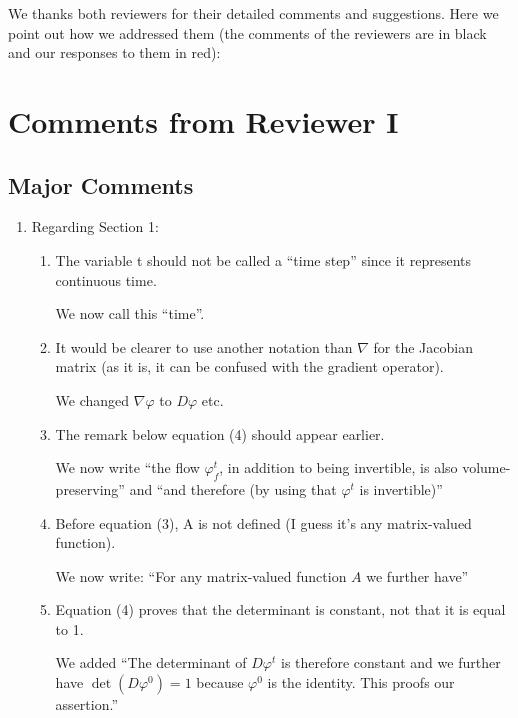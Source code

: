 \documentclass{article}
\begin{document}
We thanks both reviewers for their detailed comments and suggestions. Here we point out how we addressed them (the comments of the reviewers are in black and our responses to them in {\color{mred} red}):

\section{Comments from Reviewer I}

\subsection*{Major Comments}
\begin{enumerate}
\item Regarding Section 1:
\begin{enumerate}[label=\arabic*.]
\item The variable t should not be called a ``time step'' since it represents continuous time.

    {\color{mred}We now call this ``time''}.

\item It would be clearer to use another notation than $\nabla$ for the Jacobian matrix (as it is, it can be confused with the gradient operator).

    {\color{mred}We changed $\nabla\varphi$ to $D\varphi$ etc.}

\item The remark below equation (4) should appear earlier.

    {\color{mred}We now write ``the flow $\varphi_f^t$, in addition to being invertible, is also volume-preserving'' and ``and therefore (by using that $\varphi^t$ is invertible)''}

\item Before equation (3), A is not defined (I guess it's any matrix-valued function).

    {\color{mred} We now write: ``For any matrix-valued function $A$ we further have''}

\item Equation (4) proves that the determinant is constant, not that it is equal to 1.

    {\color{mred} We added ``The determinant of $D\varphi^t$ is therefore constant and we further have $\det(D\varphi^0) = 1$ because $\varphi^0$ is the identity. This proofs our assertion.''}

\end{enumerate}


\end{enumerate}
\end{document}
